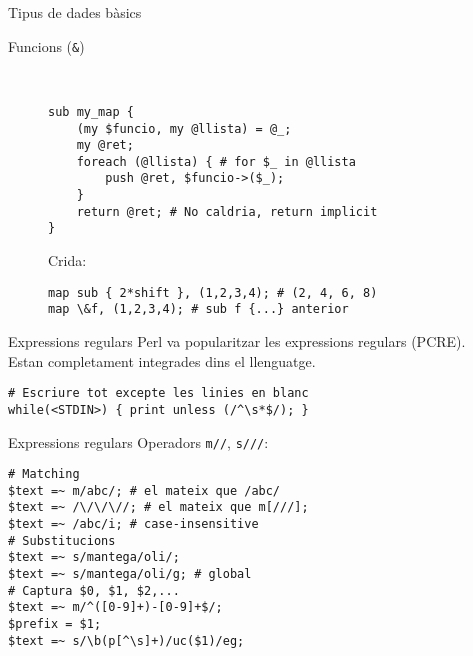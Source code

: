 \documentclass{beamer}
\begin{document}
\begin{frame}[fragile]{Tipus de dades bàsics}
  \begin{description}
    \item[Funcions (\texttt{\&})] \hfill\\
      \begin{lstlisting}
sub my_map {
    (my $funcio, my @llista) = @_;
    my @ret;
    foreach (@llista) { # for $_ in @llista
        push @ret, $funcio->($_);
    }
    return @ret; # No caldria, return implicit
}
      \end{lstlisting}
      Crida:
      \begin{lstlisting}
map sub { 2*shift }, (1,2,3,4); # (2, 4, 6, 8)
map \&f, (1,2,3,4); # sub f {...} anterior
      \end{lstlisting}
  \end{description}
\end{frame}

\begin{frame}[fragile]{Expressions regulars}
  \indent Perl va popularitzar les expressions regulars (PCRE). \\
  \indent Estan completament integrades dins el llenguatge.\\
  \begin{center}
  \begin{minipage}{0.75\textwidth}
  \begin{lstlisting}
# Escriure tot excepte les linies en blanc
while(<STDIN>) { print unless (/^\s*$/); }
  \end{lstlisting}
  \end{minipage}
  \end{center}
\end{frame}
\begin{frame}[fragile]{Expressions regulars}
  Operadors \texttt{m//}, \texttt{s///}:
  \begin{center}
  \begin{minipage}{0.75\textwidth}
  \begin{lstlisting}
# Matching
$text =~ m/abc/; # el mateix que /abc/
$text =~ /\/\/\//; # el mateix que m[///];
$text =~ /abc/i; # case-insensitive
# Substitucions
$text =~ s/mantega/oli/;
$text =~ s/mantega/oli/g; # global
# Captura $0, $1, $2,...
$text =~ m/^([0-9]+)-[0-9]+$/;
$prefix = $1;
$text =~ s/\b(p[^\s]+)/uc($1)/eg;
  \end{lstlisting}
  \end{minipage}
  \end{center}
\end{frame}
\end{document}
